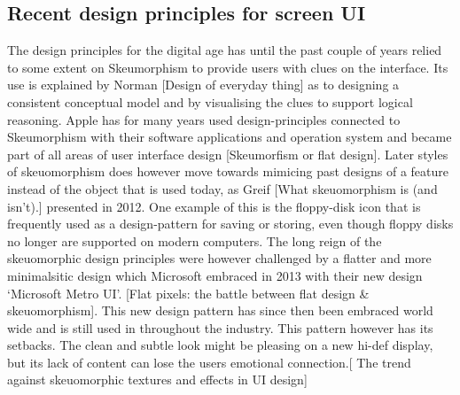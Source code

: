 \subsection{Recent design principles for screen UI}
The design principles for the digital age has until the past couple of years relied to some extent on Skeumorphism to provide users with clues on the interface. Its use is explained by Norman [Design of everyday thing] as to designing a consistent conceptual model and by visualising the clues to support logical reasoning. Apple has for many years used design-principles connected to Skeumorphism with their software applications and operation system and became part of all areas of user interface design [Skeumorfism or flat design]. Later styles of skeuomorphism does however move towards mimicing past designs of a feature instead of the object that is used today, as Greif [What skeuomorphism is (and isn’t).] presented in 2012. One example of this is the floppy-disk icon that is frequently used as a design-pattern for saving or storing, even though floppy disks no longer are supported on modern computers.
The long reign of the skeuomorphic design principles were however challenged by a flatter and more minimalsitic design which Microsoft embraced in 2013 with their new design ‘Microsoft Metro UI’. [Flat pixels: the battle between flat design & skeuomorphism]. This new design pattern has since then been embraced world wide and is still used in throughout the industry. This pattern however has its setbacks. The clean and subtle look might be pleasing on a new hi-def display, but its lack of content can lose the users emotional connection.[ The trend against skeuomorphic textures and effects in UI design]

